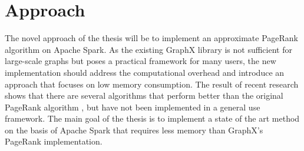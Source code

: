 \documentclass[a4paper,12pt]{article}
\begin{document}
 

\section{Approach}
The novel approach of the thesis will be to implement an approximate PageRank algorithm on Apache Spark. As the existing GraphX library is not sufficient for large-scale graphs but poses a practical framework for many users, the new implementation should address the computational overhead and introduce an approach that focuses on low memory consumption. 
The result of recent research shows that there are several algorithms that perform better than the original PageRank algorithm \cite{wu_efficient_2024}, but have not been implemented in a general use framework. The main goal of the thesis is to implement a state of the art method on the basis of Apache Spark that requires less memory than GraphX's PageRank implementation. 
\end{document}
